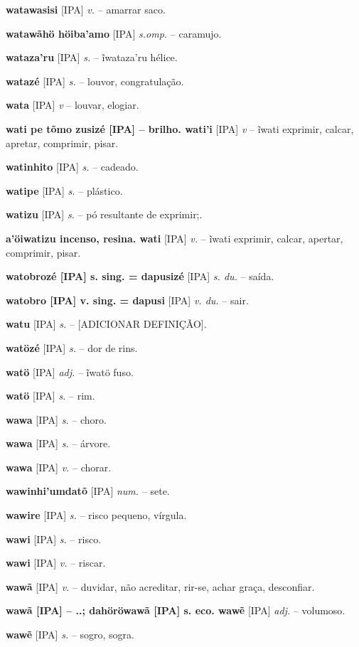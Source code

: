 \textbf{watawasisi} [IPA] \textit{v.} -- amarrar saco.

\textbf{watawãhö höiba'amo} [IPA] \textit{s.omp.} -- caramujo.

\textbf{wataza'ru} [IPA] \textit{s.} -- ĩwataza'ru hélice.

\textbf{watazé} [IPA] \textit{s.} -- louvor, congratulação.

\textbf{wata} [IPA] \textit{v} -- louvar, elogiar.

\textbf{wati pe tõmo zusizé [IPA]  -- brilho. wati'i} [IPA] \textit{v} -- ĩwati exprimir, calcar, apretar, comprimir, pisar.

\textbf{watinhito} [IPA] \textit{s.} -- cadeado.

\textbf{watipe} [IPA] \textit{s.} -- plástico.

\textbf{watizu} [IPA] \textit{s.} -- pó resultante de exprimir;.

\textbf{a'öiwatizu incenso, resina. wati} [IPA] \textit{v.} -- ĩwati exprimir, calcar, apertar, comprimir, pisar.

\textbf{watobrozé [IPA] s. sing. = dapusizé} [IPA] \textit{s. du.} -- saída.

\textbf{watobro [IPA] v. sing. = dapusi} [IPA] \textit{v. du.} -- sair.

\textbf{watu} [IPA] \textit{s.} -- [ADICIONAR DEFINIÇÃO].

\textbf{watözé} [IPA] \textit{s.} -- dor de rins.

\textbf{watö} [IPA] \textit{adj.} -- ĩwatö fuso.

\textbf{watö} [IPA] \textit{s.} -- rim.

\textbf{wawa} [IPA] \textit{s.} -- choro.

\textbf{wawa} [IPA] \textit{s.} -- árvore.

\textbf{wawa} [IPA] \textit{v.} -- chorar.

\textbf{wawinhi'umdatõ} [IPA] \textit{num.} -- sete.

\textbf{wawire} [IPA] \textit{s.} -- risco pequeno, vírgula.

\textbf{wawi} [IPA] \textit{s.} -- risco.

\textbf{wawi} [IPA] \textit{v.} -- riscar.

\textbf{wawã} [IPA] \textit{v.} -- duvidar, não acreditar, rir-se, achar graça, desconfiar.

\textbf{wawã [IPA]  -- ..; dahöröwawã [IPA] s. eco. wawẽ} [IPA] \textit{adj.} -- volumoso.

\textbf{wawẽ} [IPA] \textit{s.} -- sogro, sogra.

